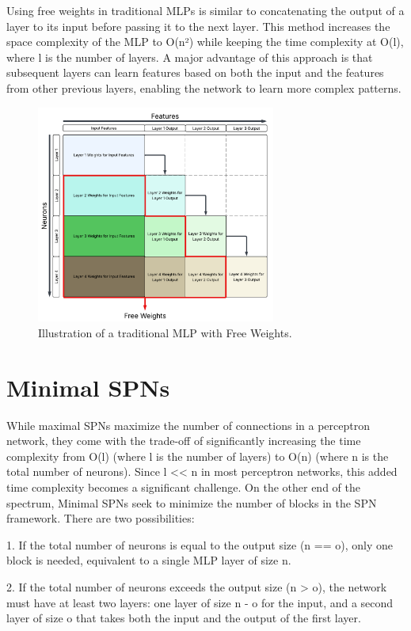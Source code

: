 Using free weights in traditional MLPs is similar to concatenating the output of a layer to its input before passing it to the next layer. This method increases the space complexity of the MLP to O(n²) while keeping the time complexity at O(l), where l is the number of layers. A major advantage of this approach is that subsequent layers can learn features based on both the input and the features from other previous layers, enabling the network to learn more complex patterns.

\begin{figure}[ht]
\centering
\includegraphics[width=0.7\textwidth]{Figures/Methodology/Free_Weights_SPN_Weights.png}
\caption{Illustration of a traditional MLP with Free Weights.}
\label{fig:fwSpn}
\end{figure}

\section{Minimal SPNs}

While maximal SPNs maximize the number of connections in a perceptron network, they come with the trade-off of significantly increasing the time complexity from O(l) (where l is the number of layers) to O(n) (where n is the total number of neurons). Since l << n in most perceptron networks, this added time complexity becomes a significant challenge.
On the other end of the spectrum, Minimal SPNs seek to minimize the number of blocks in the SPN framework. There are two possibilities:

1.	If the total number of neurons is equal to the output size (n == o), only one block is needed, equivalent to a single MLP layer of size n.

2.	If the total number of neurons exceeds the output size (n > o), the network must have at least two layers: one layer of size n - o for the input, and a second layer of size o that takes both the input and the output of the first layer.
 
